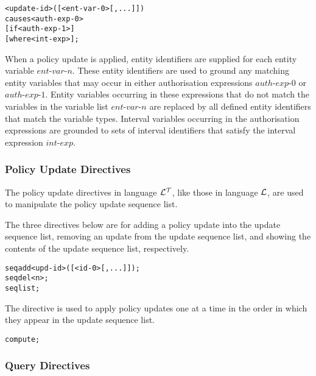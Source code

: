 \documentclass[11pt]{report}
\newenvironment{vverbatim}
{
  \begin{alltt}
}
{
    \vspace{-\baselineskip}
  \end{alltt}
}
\begin{document}
          \begin{vverbatim}
  <update-id>([<ent-var-0>[, ...]])
    causes <auth-exp-0>
    [if <auth-exp-1>]
    [where <int-exp>];
          \end{vverbatim}

          When a policy update is applied, entity identifiers are supplied for
          each entity variable $ent$-$var$-$n$. These entity identifiers are
          used to ground any matching entity variables that may occur in either
          authorisation expressions $auth$-$exp$-$0$ or $auth$-$exp$-$1$.
          Entity variables occurring in these expressions that do not match
          the variables in the variable list $ent$-$var$-$n$ are replaced by
          all defined entity identifiers that match the variable types.
          Interval variables occurring in the authorisation expressions are
          grounded to sets of interval identifiers that satisfy the interval
          expression $int$-$exp$.

        \subsubsection{Policy Update Directives}

          The policy update directives in language ${\cal L^T}$, like those
          in language ${\cal L}$, are used to manipulate the policy update
          sequence list.

          The three directives below are for adding a policy update into the
          update sequence list, removing an update from the update sequence
          list, and showing the contents of the update sequence list,
          respectively.

          \begin{vverbatim}
  seq add <upd-id>([<id-0>[, ...]]);
  seq del <n>;
  seq list;
          \end{vverbatim}

          The directive is used to apply policy updates one at a time in the
          order in which they appear in the update sequence list.

          \begin{vverbatim}
  compute;
          \end{vverbatim}

        \subsubsection{Query Directives}
\end{document}

